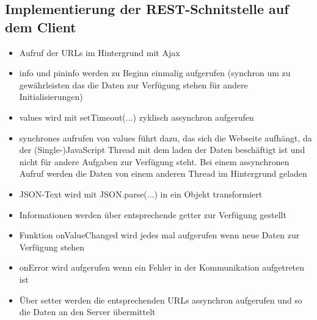 
\subsection{Implementierung der REST-Schnitstelle auf dem Client}

\begin{itemize}
	\item Aufruf der URLs im Hintergrund mit Ajax
	\item info und pininfo werden zu Beginn einmalig aufgerufen (synchron um zu 
	      gewährleisten das die Daten zur Verfügung stehen für andere Initialisierungen)
	\item values wird mit setTimeout(...) zyklisch assynchron aufgerufen
	\item synchrones aufrufen von values führt dazu, das sich die Webseite aufhängt, da
	      der (Single-)JavaScript Thread mit dem laden der Daten beschäftigt ist und nicht
	      für andere Aufgaben zur Verfügung steht. Bei einem assynchronen Aufruf werden 
	      die Daten von einem anderen Thread im Hintergrund geladen
	\item JSON-Text wird mit JSON.parse(...) in ein Objekt transformiert
	\item Informationen werden über entsprechende getter zur Verfügung gestellt
	\item Funktion onValueChanged wird jedes mal aufgerufen wenn neue Daten zur 
	      Verfügung stehen
	\item onError wird aufgerufen wenn ein Fehler in der Kommunikation aufgetreten ist
	\item Über setter werden die entsprechenden URLs assynchron aufgerufen und so die 
	      Daten an den Server übermittelt
\end{itemize}


